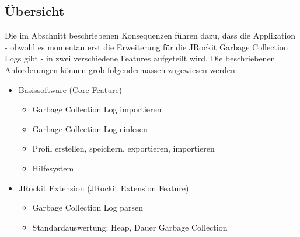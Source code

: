 \subsection{Übersicht}
Die im Abschnitt  beschriebenen Konsequenzen führen dazu, dass die Applikation - obwohl es momentan erst die Erweiterung für die JRockit Garbage Collection Logs gibt - in zwei verschiedene Features aufgeteilt wird. Die beschriebenen Anforderungen können grob folgendermassen zugewiesen werden:
\begin{itemize}
	\item Basissoftware (Core Feature)
		\begin{itemize}
			\item Garbage Collection Log importieren
			\item Garbage Collection Log einlesen
			\item Profil erstellen, speichern, exportieren, importieren
			\item Hilfesystem
		\end{itemize}
	\item JRockit Extension (JRockit Extension Feature)
		\begin{itemize}
			\item Garbage Collection Log parsen
			\item Standardauswertung: Heap, Dauer Garbage Collection
		\end{itemize}
\end{itemize}

